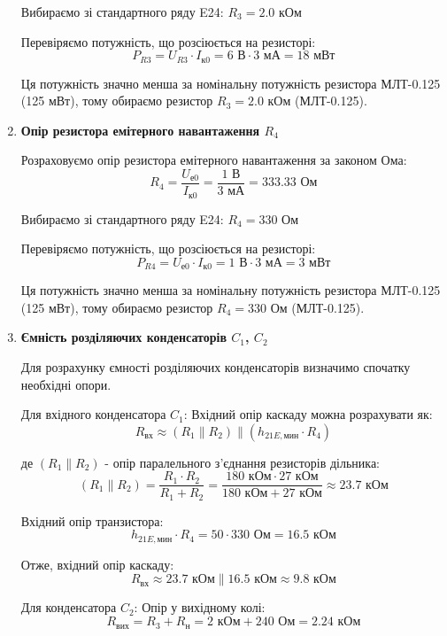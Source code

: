 \documentclass[main.tex]{subfiles}
\begin{document}
\begin{enumerate}
Вибираємо зі стандартного ряду E24: $R_3 = 2.0\text{ кОм}$

Перевіряємо потужність, що розсіюється на резисторі:
\[
P_{R3} = U_{R3} \cdot I_{\text{к0}} = 6\text{ В} \cdot 3\text{ мА} = 18\text{ мВт}
\]

Ця потужність значно менша за номінальну потужність резистора МЛТ-0.125 (125 мВт), тому обираємо резистор $R_3 = 2.0\text{ кОм}$ (МЛТ-0.125).

\item \textbf{Опір резистора емітерного навантаження $R_4$} \newline

Розраховуємо опір резистора емітерного навантаження за законом Ома:
\[
R_4 = \frac{U_{\text{е0}}}{I_{\text{к0}}} = \frac{1\text{ В}}{3\text{ мА}} = 333.33\text{ Ом}
\]

Вибираємо зі стандартного ряду E24: $R_4 = 330\text{ Ом}$

Перевіряємо потужність, що розсіюється на резисторі:
\[
P_{R4} = U_{\text{е0}} \cdot I_{\text{к0}} = 1\text{ В} \cdot 3\text{ мА} = 3\text{ мВт}
\]

Ця потужність значно менша за номінальну потужність резистора МЛТ-0.125 (125 мВт), тому обираємо резистор $R_4 = 330\text{ Ом}$ (МЛТ-0.125).

\item \textbf{Ємність розділяючих конденсаторів $C_1$, $C_2$} \newline

Для розрахунку ємності розділяючих конденсаторів визначимо спочатку необхідні опори.

Для вхідного конденсатора $C_1$:
Вхідний опір каскаду можна розрахувати як:
\[R_{\text{вх}} \approx (R_1 \parallel R_2) \parallel (h_{21E,\text{мин}} \cdot R_4)\]

де $(R_1 \parallel R_2)$ - опір паралельного з'єднання резисторів дільника:
\[(R_1 \parallel R_2) = \frac{R_1 \cdot R_2}{R_1 + R_2} = \frac{180\text{ кОм} \cdot 27\text{ кОм}}{180\text{ кОм} + 27\text{ кОм}} \approx 23.7\text{ кОм}\]

Вхідний опір транзистора:
\[h_{21E,\text{мин}} \cdot R_4 = 50 \cdot 330\text{ Ом} = 16.5\text{ кОм}\]

Отже, вхідний опір каскаду:
\[R_{\text{вх}} \approx 23.7\text{ кОм} \parallel 16.5\text{ кОм} \approx 9.8\text{ кОм}\]

Для конденсатора $C_2$:
Опір у вихідному колі:
\[R_{\text{вих}} = R_3 + R_{\text{н}} = 2\text{ кОм} + 240\text{ Ом} = 2.24\text{ кОм}\]


\end{enumerate}
\end{document}
